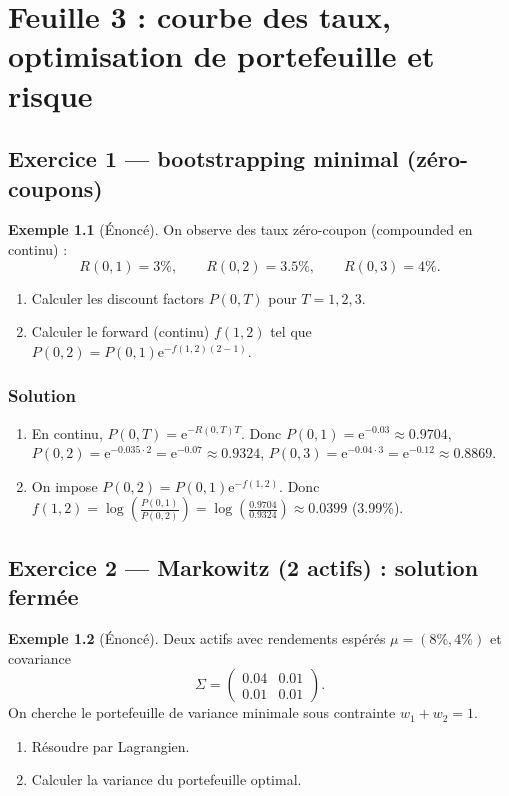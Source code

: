 \documentclass[11pt,a4paper]{report}
\newcommand{\ee}{\mathrm{e}}
\newcommand{\1}{\mathbbm{1}}
\theoremstyle{definition}
\newtheorem{example}{Exemple}[chapter]
\theoremstyle{plain}
\theoremstyle{remark}
\begin{document}
\chapter{Feuille 3 : courbe des taux, optimisation de portefeuille et risque}
\label{chap:td3}

\section{Exercice 1 --- bootstrapping minimal (zéro-coupons)}
\begin{example}[Énoncé]
On observe des taux zéro-coupon (compounded en continu) :
\[R(0,1)=3\%,\qquad R(0,2)=3.5\%,\qquad R(0,3)=4\%.
\]
\begin{enumerate}[label=\alph*)]
  \item Calculer les discount factors $P(0,T)$ pour $T=1,2,3$.
  \item Calculer le forward (continu) $f(1,2)$ tel que $P(0,2)=P(0,1)\ee^{-f(1,2)(2-1)}$.
\end{enumerate}
\end{example}

\subsection*{Solution}
\begin{enumerate}[label=\alph*)]
  \item En continu, $P(0,T)=\ee^{-R(0,T)T}$.
  Donc $P(0,1)=\ee^{-0.03}\approx 0.9704$,
  $P(0,2)=\ee^{-0.035\cdot 2}=\ee^{-0.07}\approx 0.9324$,
  $P(0,3)=\ee^{-0.04\cdot 3}=\ee^{-0.12}\approx 0.8869$.
  \item On impose $P(0,2)=P(0,1)\ee^{-f(1,2)}$.
  Donc $f(1,2)=\log\left(\frac{P(0,1)}{P(0,2)}\right)=\log\left(\frac{0.9704}{0.9324}\right)\approx 0.0399$ (3.99\%).
\end{enumerate}

\section{Exercice 2 --- Markowitz (2 actifs) : solution fermée}
\begin{example}[Énoncé]
Deux actifs avec rendements espérés $\mu=(8\%,4\%)$ et covariance
\[\Sigma=\begin{pmatrix}0.04 & 0.01\\ 0.01 & 0.01\end{pmatrix}.
\]
On cherche le portefeuille de variance minimale sous contrainte $w_1+w_2=1$.
\begin{enumerate}[label=\alph*)]
  \item Résoudre par Lagrangien.
  \item Calculer la variance du portefeuille optimal.
\end{enumerate}
\end{example}
\end{document}
